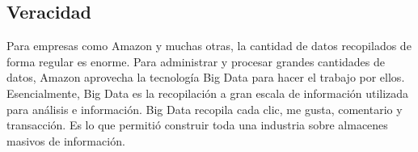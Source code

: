 
\subsection{Veracidad}
Para empresas como Amazon y muchas otras, la cantidad de datos recopilados de forma regular es enorme. Para administrar y procesar grandes cantidades de datos, Amazon aprovecha la tecnología Big Data para hacer el trabajo por ellos. Esencialmente, Big Data es la recopilación a gran escala de información utilizada para análisis e información. Big Data recopila cada clic, me gusta, comentario y transacción. Es lo que permitió construir toda una industria sobre almacenes masivos de información.
